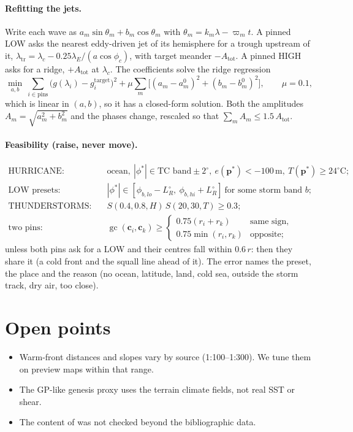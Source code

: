 \documentclass[11pt,a4paper]{article}
\begin{document}
\paragraph{Refitting the jets.} Write each wave as
$a_m\sin\theta_m+b_m\cos\theta_m$ with $\theta_m=k_m\lambda-\varpi_m t$. A pinned LOW asks the
nearest eddy-driven jet of its hemisphere for a trough upstream of it,
$\lambda_{\mathrm{tr}}=\lambda_c-0.25\lambda_E/(a\cos\phi_c)$, with target meander
$-A_{\mathrm{tot}}$. A pinned HIGH asks for a ridge, $+A_{\mathrm{tot}}$ at $\lambda_c$. The
coefficients solve the ridge regression
\begin{equation}
  \min_{a,b}\ \sum_{i\in\text{pins}}\big(g(\lambda_i)-g_i^{\mathrm{target}}\big)^2
  +\mu\sum_m\big[(a_m-a_m^0)^2+(b_m-b_m^0)^2\big],\qquad \mu=0.1,
\end{equation}
which is linear in $(a,b)$, so it has a closed-form solution. Both the amplitudes
$A_m=\sqrt{a_m^2+b_m^2}$ and the phases change, rescaled so that
$\sum_m A_m\le1.5\,A_{\mathrm{tot}}$.

\paragraph{Feasibility (raise, never move).}
\begin{align}
  \text{HURRICANE:}\quad & \text{ocean},\ |\phi^*|\in\text{TC band}\pm2^\circ,\
     e(\mathbf{p}^*)<-100\,\mathrm{m},\ T(\mathbf{p}^*)\ge24^\circ\mathrm{C};\\
  \text{LOW presets:}\quad & |\phi^*|\in[\phi_{b,lo}-L_R^\circ,\ \phi_{b,hi}+L_R^\circ]
     \ \text{for some storm band } b;\\
  \text{THUNDERSTORMS:}\quad & S(0.4,0.8,H)\,S(20,30,T)\ge0.3;\\
  \text{two pins:}\quad & \operatorname{gc}(\mathbf{c}_i,\mathbf{c}_k)\ge
     \begin{cases}0.75(r_i+r_k) & \text{same sign,}\\ 0.75\min(r_i,r_k) & \text{opposite;}\end{cases}
\end{align}
unless both pins ask for a LOW and their centres fall within $0.6\,r$: then they share it (a
cold front and the squall line ahead of it). The error names the preset, the place and the
reason (no ocean, latitude, land, cold sea, outside the storm track, dry air, too close).

\section{Open points}
\begin{itemize}
\item Warm-front distances and slopes vary by source (1:100--1:300). We tune them on preview
  maps within that range.
\item The GP-like genesis proxy uses the terrain climate fields, not real SST or shear.
\item The content of \cite{hillaire2016,bauer2019,harris2003,browning1990} was not checked
  beyond the bibliographic data.
\end{itemize}



\end{document}
